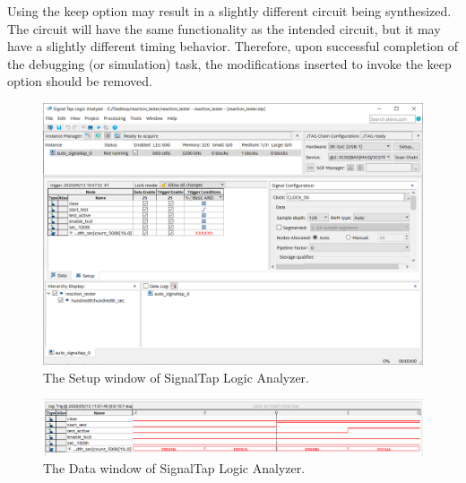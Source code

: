 \documentclass[11pt, twoside, pdftex]{article}
\begin{document}
\noindent
Using the keep option may result in a slightly different circuit
being synthesized. The circuit will have the same functionality as the intended
circuit, but it may have a slightly different timing behavior. Therefore, upon
successful completion of the debugging (or simulation) task, the modifications
inserted to invoke the keep option should be removed. 

\begin{figure}[H]
   \begin{center}
      \includegraphics[scale=0.55]{figures/figure18.png}
   \caption{The Setup window of SignalTap Logic Analyzer.} 
	 \label{fig:18}
	 \end{center}
\end{figure}

\begin{figure}[H]
   \begin{center}
      \includegraphics[scale=0.55]{figures/figure19.png}
   \caption{The Data window of SignalTap Logic Analyzer.} 
	 \label{fig:19}
	 \end{center}
\end{figure}
\end{document}
